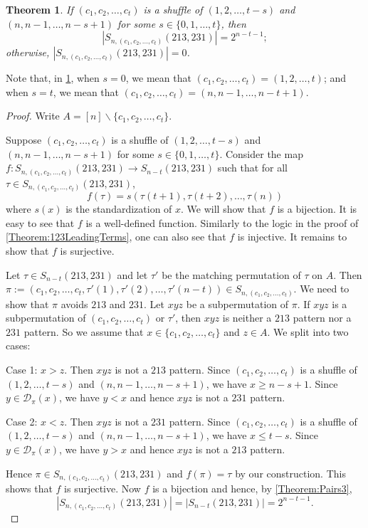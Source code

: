 \documentclass[11pt]{article}
\newtheorem{theorem}{Theorem}[section]
\theoremstyle{definition}
\numberwithin{equation}{section}
\begin{document}
\begin{theorem}\label{Theorem:LeadingTerms213;231}
If $(c_1,c_2,\ldots,c_t)$ is a shuffle of $(1,2,\ldots,t-s)$ and $(n,n-1,\ldots,n-s+1)$ for some $s\in\{0,1,\ldots,t\}$, then
\[|S_{n,(c_1,c_2,\ldots,c_t)}(213,231)|=2^{n-t-1};\]
otherwise, $|S_{n,(c_1,c_2,\ldots,c_t)}(213,231)|=0$.
\end{theorem}
Note that, in \cref{Theorem:LeadingTerms213;231}, when $s=0$, we mean that $(c_1,c_2,\ldots,c_t)=(1,2,\ldots,t)$; and when $s=t$, we mean that $(c_1,c_2,\ldots,c_t)=(n,n-1,\ldots,n-t+1)$.
\begin{proof}
Write $A=[n]\backslash\{c_1,c_2,\ldots,c_t\}$.

Suppose $(c_1,c_2,\ldots,c_t)$ is a shuffle of $(1,2,\ldots,t-s)$ and $(n,n-1,\ldots,n-s+1)$ for some $s\in\{0,1,\ldots,t\}$. Consider the map $f:S_{n,(c_1,c_2,\ldots,c_t)}(213,231)\to S_{n-t}(213,231)$ such that for all $\tau\in S_{n,(c_1,c_2,\ldots,c_t)}(213,231)$,
\[
f(\tau)=s(\tau(t+1),\tau(t+2),\ldots,\tau(n))
\]
where $s(x)$ is the standardization of $x$. We will show that $f$ is a bijection. It is easy to see that $f$ is a well-defined function. Similarly to the logic in the proof of \cref{Theorem:123LeadingTerms}, one can also see that $f$ is injective. It remains to show that $f$ is surjective.

Let $\tau\in S_{n-t}(213,231)$ and let $\tau'$ be the matching permutation of $\tau$ on $A$. Then $\pi:=(c_1,c_2,\ldots,c_t,\tau'(1),\tau'(2),\ldots,\tau'(n-t))\in S_{n,(c_1,c_2,\ldots,c_t)}$. We need to show that $\pi$ avoids $213$ and $231$. Let $xyz$ be a subpermutation of $\pi$. If $xyz$ is a subpermutation of $(c_1,c_2,\ldots,c_t)$ or $\tau'$, then $xyz$ is neither a $213$ pattern nor a $231$ pattern. So we assume that $x\in\{c_1,c_2,\ldots,c_t\}$ and $z\in A$. We split into two cases:

Case 1: $x>z$. Then $xyz$ is not a $213$ pattern. Since $(c_1,c_2,\ldots,c_t)$ is a shuffle of $(1,2,\ldots,t-s)$ and $(n,n-1,\ldots,n-s+1)$, we have $x\geq n-s+1$. Since $y\in\mathcal{D}_\pi(x)$, we have $y<x$ and hence $xyz$ is not a $231$ pattern.

Case 2: $x<z$. Then $xyz$ is not a $231$ pattern. Since $(c_1,c_2,\ldots,c_t)$ is a shuffle of $(1,2,\ldots,t-s)$ and $(n,n-1,\ldots,n-s+1)$, we have $x\leq t-s$. Since $y\in\mathcal{D}_\pi(x)$, we have $y>x$ and hence $xyz$ is not a $213$ pattern.

Hence $\pi\in S_{n,(c_1,c_2,\ldots,c_t)}(213,231)$ and $f(\pi)=\tau$ by our construction. This shows that $f$ is surjective. Now $f$ is a bijection and hence, by \cref{Theorem:Pairs3},
\[
|S_{n,(c_1,c_2,\ldots,c_t)}(213,231)|=|S_{n-t}(213,231)|=2^{n-t-1}.
\]


\end{proof}
\end{document}

